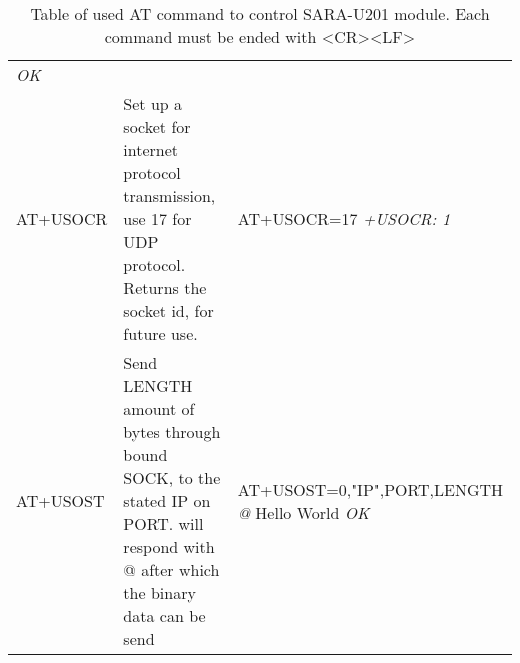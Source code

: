 \begin{table}[H]
\begin{tabularx}{1.3\textwidth}{p{2cm} X X}
		\textit{OK} \\
		AT+USOCR & Set up a socket for internet protocol transmission, use 17 for UDP protocol. Returns the socket id, for future use.& AT+USOCR=17 \newline \newline
		\textit{+USOCR: 1} \\
		AT+USOST & Send LENGTH amount of bytes through bound SOCK, to the stated IP on PORT. \SARA will respond with @ after which the binary data can be send& AT+USOST=0,"IP",PORT,LENGTH \newline \newline
		\textit{@} \newline
		Hello World \newline
		\textit{OK} \\
		\bottomrule
	\end{tabularx}
	\caption{Table of used AT command to control SARA-U201 module. Each command must be ended with <CR><LF>}
	\label{tab:ATDesc}
\end{table}


